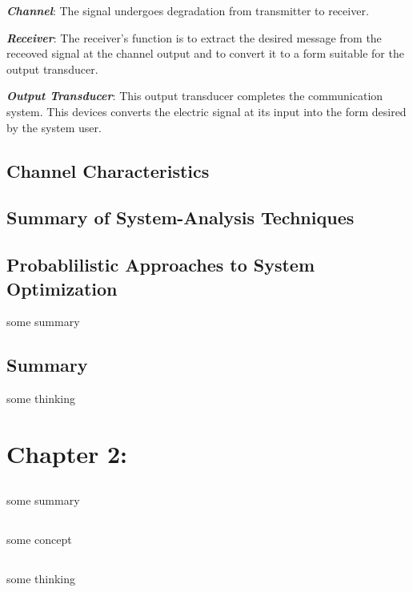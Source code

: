 \documentclass[12pt,a4paper]{book}
\begin{document}
\textbf{\textit{Channel}}: The signal undergoes degradation from transmitter to receiver.

\textbf{\textit{Receiver}}: The receiver's function is to extract the desired message from the receoved signal at the channel output and to convert it to a form suitable for the output transducer.

\textbf{\textit{Output Transducer}}: This output transducer completes the communication system. This devices converts the electric signal at its input into the form desired by the system user.
\section{Channel Characteristics}

\section{Summary of System-Analysis Techniques}

\section{Probablilistic Approaches to System Optimization}
\begin{notebox}[Summary]
some summary
\end{notebox}

\section{Summary}
\begin{notebox}[Thinking]
some thinking
\end{notebox}

\chapter{Chapter 2:}
\section{}
\begin{notebox}[Summary]
some summary
\end{notebox}

\section{}
\begin{notebox}[Concept]
some concept 
\end{notebox}

\section{}
\begin{notebox}[Thinking]
some thinking
\end{notebox}
\end{document}
